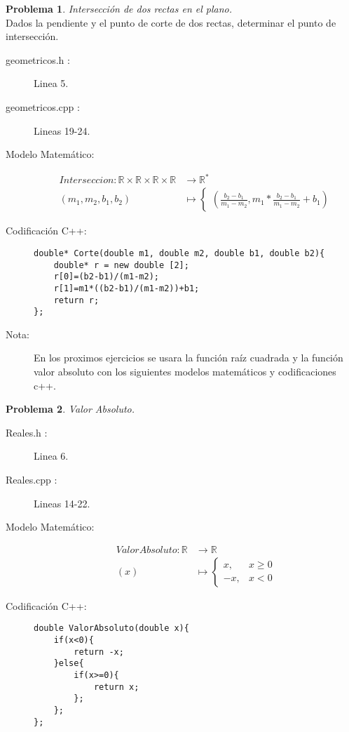 \documentclass{article}
\theoremstyle{plain}
\theoremstyle{definition}
\newtheorem{problem}{Problema}
\begin{document}
\begin{problem} \emph{Intersección de dos rectas en el plano.}\\
\hspace*{7mm}Dados la pendiente y el punto de corte de dos rectas, determinar el punto de intersección.
%
\begin{description}
\item[geometricos.h :] Linea 5. \item[geometricos.cpp :] Lineas 19-24.

\item[Modelo Matemático:]
\begin{align*}
Interseccion: \mathbb{R}\times\mathbb{R}\times\mathbb{R}\times\mathbb{R} &\to \mathbb{R}^{*}\\
(m_{1},m_{2},b_{1},b_{2}) &\mapsto \begin{cases}
\left(\frac{b_{2}-b_{1}}{m_{1}-m_{2}},m_{1}*\frac{b_{2}-b_{1}}{m_{1}-m_{2}}+b_{1}\right)
\end{cases}
\end{align*}
%
\item[Codificación \textsf{C++}:]\hfill
%
\begin{verbatim}
double* Corte(double m1, double m2, double b1, double b2){
    double* r = new double [2];
    r[0]=(b2-b1)/(m1-m2);
    r[1]=m1*((b2-b1)/(m1-m2))+b1;
    return r;
};
\end{verbatim}

\item[Nota:]
En los proximos ejercicios se usara la función raíz cuadrada y la función valor absoluto con los siguientes modelos matemáticos y codificaciones c++.\\
\end{description}
\end{problem}

\begin{problem} \emph{Valor Absoluto.}\\
\begin{description}
\item[Reales.h :] Linea 6. \item[Reales.cpp :] Lineas 14-22.

\item[Modelo Matemático:]
\begin{align*}
ValorAbsoluto: \mathbb{R} &\to \mathbb{R}\\
(x) &\mapsto \begin{cases}
x,&x\geq0\\
-x,&x<0
\end{cases}
\end{align*}
%
\item[Codificación \textsf{C++}:]\hfill
%
\begin{verbatim}
double ValorAbsoluto(double x){
    if(x<0){
        return -x;
    }else{
        if(x>=0){
            return x;
        };
    };
};
\end{verbatim}
\end{description}
\end{problem}
\end{document}
